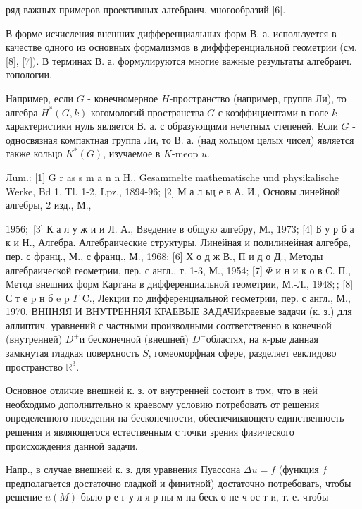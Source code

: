 \documentclass[10pt]{article}
\begin{document}
ряд важных примеров проективных алгебраич. многообразий [6].



В форме исчисления внешних дифференциальных форм В. а. используется в качестве одного из основных формализмов в диффференциальной геометрии (см. [8], [7]). В терминах В. а. формулируются многие важные результаты алгебраич. топологии.



Например, если $G$ - конечномерное $H$-пространство (например, группа Ли), то алгебра $H^{*}(G, k)$ когомологий пространства $G$ с коэффициентами в поле $k$ характеристики нуль является В. а. с образующими нечетных степеней. Если $G$ - односвязная компактная группа Ли, то В. а. (над кольцом целых чисел) является также кольцо $K^{*}(G)$, изучаемое в $K$-meop $u$.



Лum.: [1] G r as s m a n n H., Gesammelte mathematische und physikalische Werke, Bd 1, Tl. 1-2, Lpz., 1894-96; [2] М а л ьц е в А. И., Основы линейной алгебры, 2 изд., М.,

$1956 ;$ [3] К а л у ж и и Л. А., Введение в общую алгебру, М., 1973; [4] Б у р б а к и Н., Алгебра. Алгебраические структуры. Линейная и полилинейная алгебра, пер. с франц., М., с франц., М., 1968; [6] Х о д ж В., П и д о Д., Методы алгебраической геометрии, пер. с англ., т. 1-3, М., 1954; [7] $\Phi$ и н и к о в С. П., Метод внешних форм Картана в дифференциальной геометрии, М.-Л., $1948 ;$; [8] С т е p н б e p $\Gamma$ C., Лекции по дифференциальной геометрии, пер. с англ., М., 1970. ВНІІНЯЯ И ВНУТРЕННЯЯ КРАЕВЫЕ ЗАДАЧИкраевые задачи (к. з.) для әллиптич. уравнений с частными производными соответственно в конечной (внутренней) $D^{+}$и бесконечной (внешней) $D^{-}$областях, на к-рые данная замкнутая гладкая поверхность $S$, гомеоморфная сфере, разделяет евклидово пространство $\mathbb{R}^{3}$.



Основное отличие внешней к. з. от внутренней состоит в том, что в ней необходимо дополнительно к краевому условию потребовать от решения определенного поведения на бесконечности, обеспечивающего единственность решения и являющегося естественным с точки зрения физического происхождения данной задачи.



Напр., в случае внешней к. з. для уравнения Пуассона $\Delta u=f$ (функция $f$ предполагается достаточно гладкой и финитной) достаточно потребовать, чтобы решение $u(M)$ было р е г у л я р ны м на беск о не ч ос т и, т. е. чтобы
\end{document}
